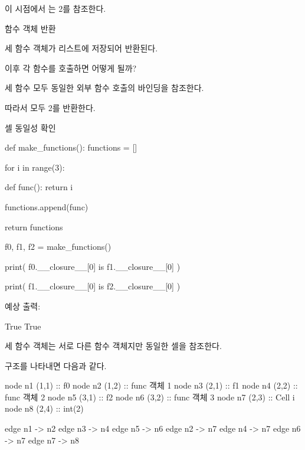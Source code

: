이 시점에서 는 2를 참조한다.

\begin{dhknote}
\begin{dhksmry}[centered]
함수 객체 반환
\end{dhksmry}
\end{dhknote}

세 함수 객체가 리스트에 저장되어 반환된다.

이후 각 함수를 호출하면 어떻게 될까?

세 함수 모두 동일한 외부 함수 호출의  바인딩을 참조한다.

따라서 모두 2를 반환한다.

\begin{dhknote}
\begin{dhksmry}[centered]
셀 동일성 확인
\end{dhksmry}
\end{dhknote}

\begin{dhkcode}
def make_functions():
    functions = []

    for i in range(3):

        def func():
            return i

        functions.append(func)

    return functions


f0, f1, f2 = make_functions()

print(
    f0.__closure__[0]
    is f1.__closure__[0]
)

print(
    f1.__closure__[0]
    is f2.__closure__[0]
)
\end{dhkcode}

예상 출력:

\begin{dhkzsh}
True
True
\end{dhkzsh}

세 함수 객체는 서로 다른 함수 객체지만 동일한 셀을 참조한다.

구조를 나타내면 다음과 같다.

\begin{dhkdiagram}[in=6]
node n1 (1,1) :: f0
node n2 (1,2) :: func 객체 1
node n3 (2,1) :: f1
node n4 (2,2) :: func 객체 2
node n5 (3,1) :: f2
node n6 (3,2) :: func 객체 3
node n7 (2,3) :: Cell i
node n8 (2,4) :: int(2)

edge n1 -> n2
edge n3 -> n4
edge n5 -> n6
edge n2 -> n7
edge n4 -> n7
edge n6 -> n7
edge n7 -> n8
\end{dhkdiagram}

